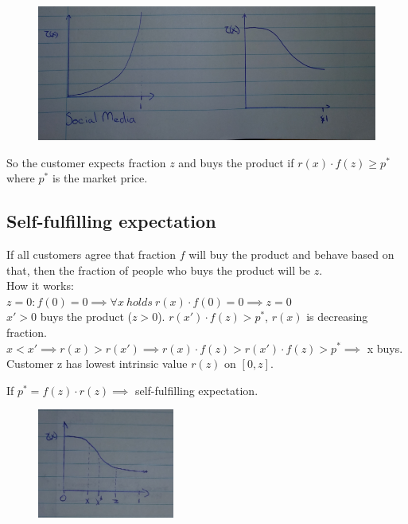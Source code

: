 \documentclass[12pt]{scrartcl}
\begin{document}
\begin{figure}[h]
	\centering
	\includegraphics[width=1\textwidth]{./images/graph_social_media.png}
\end{figure}

So the customer expects fraction $z$ and buys the product if $r(x)\cdot f(z) \geq p^{*}$ where $p^{*}$ is the market price.\\

\subsection{Self-fulfilling expectation}
If all customers agree that fraction $f$ will buy the product and behave based on that, then the fraction of people who buys the product will be $z$.\\
How it works:\\
$z = 0: f(0) = 0 \implies \forall x\ holds\ r(x)\cdot f(0) = 0 \implies z = 0$\\ 
$x' > 0$ buys the product ($z > 0$). 
$r(x')\cdot f(z) > p^{*}$, $r(x)$ is decreasing fraction.\\
$x < x' \implies r(x) > r(x') \implies r(x)\cdot f(z) > r(x')\cdot f(z) > p^{*} \implies$ x buys.\\

\noindent Customer z has lowest intrinsic value $r(z)$ on $[0,z]$.

\noindent If $p^{*} = f(z)\cdot r(z) \implies$ self-fulfilling expectation.

\begin{figure}[h]
	\centering
	\includegraphics[width=0.4\textwidth]{./images/graph_self_fulfilling.png}
\end{figure}
\end{document}
